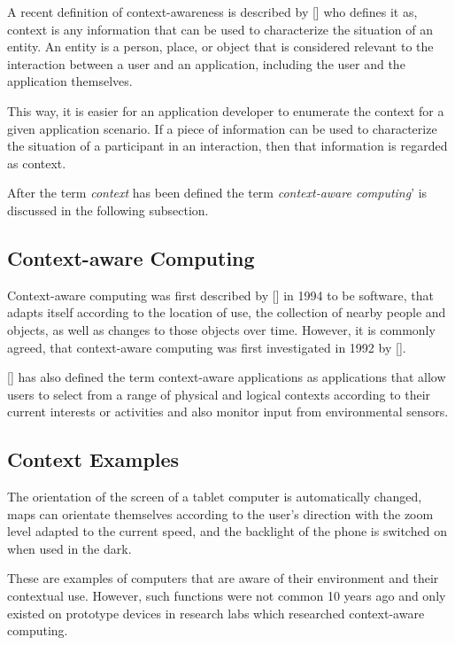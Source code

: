 A recent definition of context-awareness is described by [\citeauthor{Dey2000b}] who defines it as, context is any information that can be used to characterize the situation of an entity. An entity is a person, place, or object that is considered relevant to the interaction between a user and an application, including the user and the application themselves. 

This way, it is easier for an application developer to enumerate the context for a given application scenario. If a piece of information can be used to characterize the situation of a participant in an interaction, then that information is regarded as context.

After the term \textit{context} has been defined the term \textit{context-aware computing}' is discussed in the following subsection.

\subsection{Context-aware Computing}
Context-aware computing was first described by [\citeauthor{ieee313011}] in 1994 to be software, that adapts itself according to the location of use, the collection of nearby people and objects, as well as changes to those objects over time. However, it is commonly agreed, that context-aware computing was first investigated in 1992 by [\citeauthor{WantHFG92}]. 

[\citeauthor{RyanME}] has also defined the term context-aware applications as applications that allow users to select from a range of physical and logical contexts according to their current interests or activities and also monitor input from environmental sensors.


\subsection{Context Examples}
The orientation of the screen of a tablet computer is automatically changed, maps can orientate themselves according to the user's direction with the zoom level adapted to the current speed, and the backlight of the phone is switched on when used in the dark.

These are examples of computers that are aware of their environment and their contextual use. However, such functions were not common 10 years ago and only existed on prototype devices in research labs which researched context-aware computing.
\\

